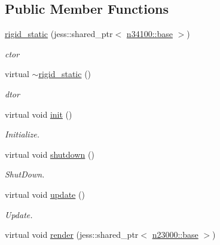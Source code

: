 \subsection*{Public Member Functions}
\begin{DoxyCompactItemize}
\item 
\hyperlink{classnebula_1_1content_1_1actor_1_1physics_1_1rigid__static_a177e9d7bdf353f3fa8c638f94d420e1a}{rigid\_\-static} (jess::shared\_\-ptr$<$ \hyperlink{classnebula_1_1content_1_1actor_1_1admin_1_1base}{n34100::base} $>$)
\begin{DoxyCompactList}\small\item\em ctor \item\end{DoxyCompactList}\item 
virtual \hyperlink{classnebula_1_1content_1_1actor_1_1physics_1_1rigid__static_a7dffb6ad1b4b49383a7c7c2fa28be0cf}{$\sim$rigid\_\-static} ()
\begin{DoxyCompactList}\small\item\em dtor \item\end{DoxyCompactList}\item 
virtual void \hyperlink{classnebula_1_1content_1_1actor_1_1physics_1_1rigid__static_a37aa702d9a31ff9529659343c6155482}{init} ()
\begin{DoxyCompactList}\small\item\em Initialize. \item\end{DoxyCompactList}\item 
virtual void \hyperlink{classnebula_1_1content_1_1actor_1_1physics_1_1rigid__static_acbf24424c29fa78f568f67fe80cee108}{shutdown} ()
\begin{DoxyCompactList}\small\item\em ShutDown. \item\end{DoxyCompactList}\item 
virtual void \hyperlink{classnebula_1_1content_1_1actor_1_1physics_1_1rigid__static_a8ecc4b9b308562ab3942bdac5b8ddfea}{update} ()
\begin{DoxyCompactList}\small\item\em Update. \item\end{DoxyCompactList}\item 
virtual void \hyperlink{classnebula_1_1content_1_1actor_1_1physics_1_1rigid__static_aa845026fbca4fa5967ac9d8ffcb2e10a}{render} (jess::shared\_\-ptr$<$ \hyperlink{classnebula_1_1platform_1_1renderer_1_1base}{n23000::base} $>$)

\end{DoxyCompactItemize}
